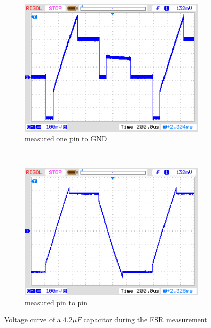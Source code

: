 \begin{figure}[H]
  \begin{subfigure}[b]{9cm}
    \centering
    \includegraphics[width=9cm]{../PNG/ESR_4uF.png}
    \caption{measured one pin to GND}
  \end{subfigure}
  ~
  \begin{subfigure}[b]{9cm}
    \centering
    \includegraphics[width=9cm]{../PNG/ESR4uF6R8.png}
    \caption{measured pin to pin}
  \end{subfigure}
  \caption{Voltage curve of a \(4.2\mu F\) capacitor during the ESR measurement}
  \label{pic:esr4}
\end{figure}


